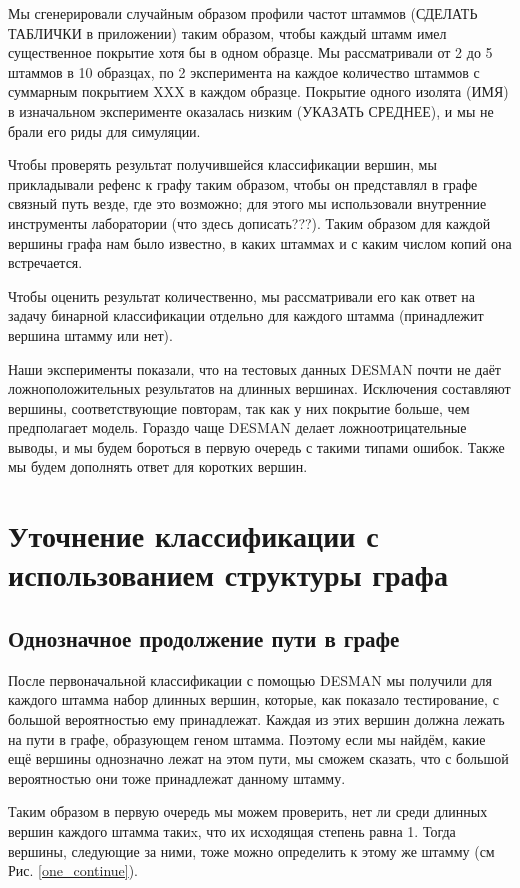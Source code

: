 \documentclass{spbau-diploma}
\begin{document}
Мы сгенерировали случайным образом профили частот штаммов (СДЕЛАТЬ ТАБЛИЧКИ в приложении) таким образом, чтобы каждый штамм имел существенное покрытие хотя бы в одном образце. Мы рассматривали от 2 до 5 штаммов в 10 образцах, по 2 эксперимента на каждое количество штаммов с суммарным покрытием XXX в каждом образце. Покрытие одного изолята (ИМЯ) в изначальном эксперименте оказалась низким (УКАЗАТЬ СРЕДНЕЕ), и мы не брали его риды для симуляции.

Чтобы проверять результат получившейся классификации вершин, мы прикладывали рефенс к графу таким образом, чтобы он представлял в графе связный путь везде, где это возможно; для этого мы использовали внутренние инструменты лаборатории (что здесь дописать???). Таким образом для каждой вершины графа нам было известно, в каких штаммах и с каким числом копий она встречается.

Чтобы оценить результат количественно, мы рассматривали его как ответ на задачу бинарной классификации отдельно для каждого штамма (принадлежит вершина штамму или нет).

Наши эксперименты показали, что на тестовых данных DESMAN почти не даёт ложноположительных результатов на длинных вершинах. Исключения составляют вершины, соответствующие повторам, так как у них покрытие больше, чем предполагает модель. Гораздо чаще DESMAN делает ложноотрицательные выводы, и мы будем бороться в первую очередь с такими типами ошибок. Также мы будем дополнять ответ для коротких вершин.



\section{Уточнение классификации с использованием структуры графа}
\subsection{Однозначное продолжение пути в графе}
После первоначальной классификации с помощью DESMAN мы получили для каждого штамма набор длинных вершин, которые, как показало тестирование, с большой вероятностью ему принадлежат. Каждая из этих вершин должна лежать на пути в графе, образующем геном штамма. Поэтому если мы найдём, какие ещё вершины однозначно лежат на этом пути, мы сможем сказать, что с большой вероятностью они тоже принадлежат данному штамму. 

Таким образом в первую очередь мы можем проверить, нет ли среди длинных вершин каждого штамма такиx, что их исходящая степень равна 1. Тогда вершины, следующие за ними, тоже можно определить к этому же штамму (см Рис. \ref{one_continue}).
\end{document}
